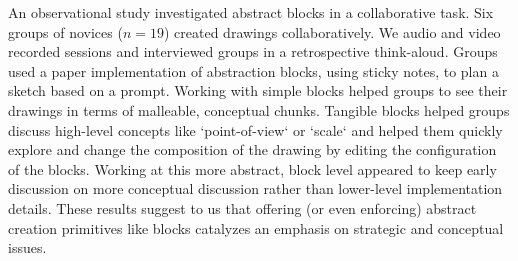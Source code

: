 
An observational study investigated abstract blocks in a collaborative task. Six groups of novices ($n=19$) created drawings collaboratively. We audio and video recorded sessions and interviewed groups in a retrospective think-aloud. Groups used a paper implementation of abstraction blocks, using sticky notes, to plan a sketch based on a prompt. Working with simple blocks helped groups to see their drawings in terms of malleable, conceptual chunks. Tangible blocks helped groups discuss high-level concepts like `point-of-view` or `scale` and helped them quickly explore and change the composition of the drawing by editing the configuration of the blocks. Working at this more abstract, block level appeared to keep early discussion on more conceptual discussion rather than lower-level implementation details. These results suggest to us that offering (or even enforcing) abstract creation primitives like blocks catalyzes an emphasis on strategic and conceptual issues. 

